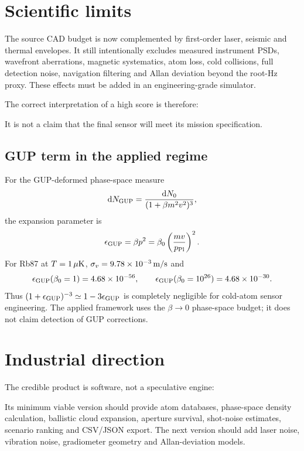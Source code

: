 \documentclass[11pt,a4paper]{article}
\newcommand{\dd}{\mathrm d}
\begin{document}
\section{Scientific limits}

The source CAD budget is now complemented by first-order laser, seismic and
thermal envelopes. It still intentionally excludes measured instrument PSDs,
wavefront aberrations, magnetic systematics, atom loss, cold collisions, full
detection noise, navigation filtering and Allan deviation beyond the root-Hz
proxy. These effects must be added in an engineering-grade simulator.

The correct interpretation of a high score is therefore:
\begin{center}
\end{center}
It is not a claim that the final sensor will meet its mission specification.

\subsection{GUP term in the applied regime}

For the GUP-deformed phase-space measure
\begin{equation}
\dd N_{\rm GUP}=\frac{\dd N_0}{(1+\beta m^2v^2)^3},
\end{equation}
the expansion parameter is
\begin{equation}
\epsilon_{\rm GUP}=\beta p^2
=\beta_0\left(\frac{mv}{p_{\rm Pl}}\right)^2.
\end{equation}
For Rb87 at $T=1\,\mu{\rm K}$, $\sigma_v=9.78\times10^{-3}\,{\rm m/s}$ and
\begin{equation}
\epsilon_{\rm GUP}(\beta_0=1)=4.68\times10^{-56},
\qquad
\epsilon_{\rm GUP}(\beta_0=10^{26})=4.68\times10^{-30}.
\end{equation}
Thus $(1+\epsilon_{\rm GUP})^{-3}\simeq1-3\epsilon_{\rm GUP}$ is completely
negligible for cold-atom sensor engineering. The applied framework uses the
$\beta\to0$ phase-space budget; it does not claim detection of GUP corrections.

\section{Industrial direction}

The credible product is software, not a speculative engine:
\begin{center}
\end{center}
Its minimum viable version should provide atom databases, phase-space density
calculation, ballistic cloud expansion, aperture survival, shot-noise
estimates, scenario ranking and CSV/JSON export. The next version should add
laser noise, vibration noise, gradiometer geometry and Allan-deviation models.
\end{document}
